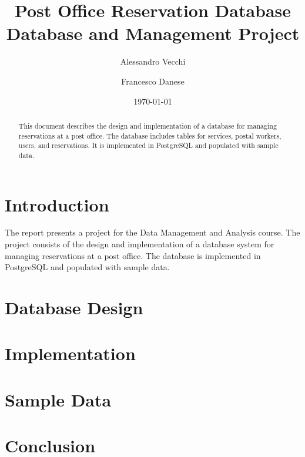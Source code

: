 \documentclass{article}
\title{Post Office Reservation Database \\ \large Database and Management Project}
\author{Alessandro Vecchi \and Francesco Danese}
\date{\today}
\begin{document}
\maketitle

\begin{abstract}
This document describes the design and implementation of a database for managing reservations at a post office. The database includes tables for services, postal workers, users, and reservations. It is implemented in PostgreSQL and populated with sample data.
\end{abstract}

\section{Introduction}

The report presents a project for the Data Management and Analysis course. The project consists of the design and implementation of a database system for managing reservations at a post office. The database is implemented in PostgreSQL and populated with sample data.

\section{Database Design}

\section{Implementation}

\section{Sample Data}

\section{Conclusion}
\end{document}
